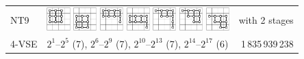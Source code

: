 \documentclass[runningheads]{llncs}
\begin{document}
\begin{tabular}{p{1.2cm}l@{~~}r}
\textsf{NT9}
&
\includegraphics[width=0.9cm]{figures/NTuple-90.pdf}
\includegraphics[width=0.9cm]{figures/NTuple-91.pdf}
\includegraphics[width=0.9cm]{figures/NTuple-92.pdf}
\includegraphics[width=0.9cm]{figures/NTuple-93.pdf}
\includegraphics[width=0.9cm]{figures/NTuple-94.pdf}
\includegraphics[width=0.9cm]{figures/NTuple-95.pdf}
\includegraphics[width=0.9cm]{figures/NTuple-96.pdf}
& with 2 stages\\
4-VSE & \phantom{\rule{1pt}{9.5pt}} $2^1$--$2^{5}$ (7), $2^{6}$--$2^{9}$ (7), $2^{10}$--$2^{13}$ (7), $2^{14}$--$2^{17}$ (6)    &  1\,835\,939\,238 \\\hline
\end{tabular}
\end{document}
